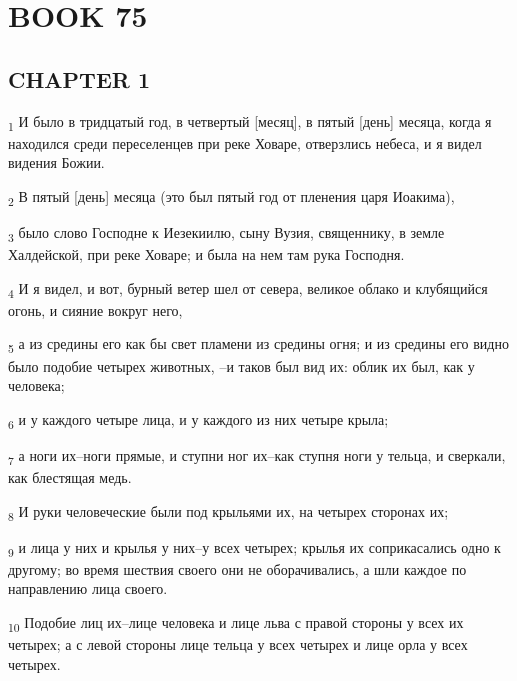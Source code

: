 \section{BOOK 75}
\subsection{CHAPTER 1}
\begin{tcolorbox}
\textsubscript{1} И было в тридцатый год, в четвертый [месяц], в пятый [день] месяца, когда я находился среди переселенцев при реке Ховаре, отверзлись небеса, и я видел видения Божии.
\end{tcolorbox}
\begin{tcolorbox}
\textsubscript{2} В пятый [день] месяца (это был пятый год от пленения царя Иоакима),
\end{tcolorbox}
\begin{tcolorbox}
\textsubscript{3} было слово Господне к Иезекиилю, сыну Вузия, священнику, в земле Халдейской, при реке Ховаре; и была на нем там рука Господня.
\end{tcolorbox}
\begin{tcolorbox}
\textsubscript{4} И я видел, и вот, бурный ветер шел от севера, великое облако и клубящийся огонь, и сияние вокруг него,
\end{tcolorbox}
\begin{tcolorbox}
\textsubscript{5} а из средины его как бы свет пламени из средины огня; и из средины его видно было подобие четырех животных, --и таков был вид их: облик их был, как у человека;
\end{tcolorbox}
\begin{tcolorbox}
\textsubscript{6} и у каждого четыре лица, и у каждого из них четыре крыла;
\end{tcolorbox}
\begin{tcolorbox}
\textsubscript{7} а ноги их--ноги прямые, и ступни ног их--как ступня ноги у тельца, и сверкали, как блестящая медь.
\end{tcolorbox}
\begin{tcolorbox}
\textsubscript{8} И руки человеческие были под крыльями их, на четырех сторонах их;
\end{tcolorbox}
\begin{tcolorbox}
\textsubscript{9} и лица у них и крылья у них--у всех четырех; крылья их соприкасались одно к другому; во время шествия своего они не оборачивались, а шли каждое по направлению лица своего.
\end{tcolorbox}
\begin{tcolorbox}
\textsubscript{10} Подобие лиц их--лице человека и лице льва с правой стороны у всех их четырех; а с левой стороны лице тельца у всех четырех и лице орла у всех четырех.
\end{tcolorbox}
